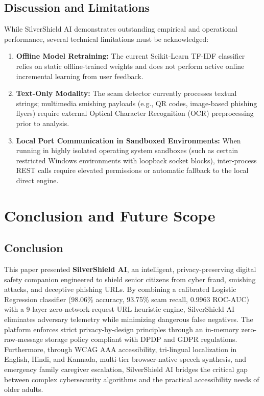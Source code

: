 \documentclass[conference]{IEEEtran}
\begin{document}
\subsection{Discussion and Limitations}
While SilverShield AI demonstrates outstanding empirical and operational performance, several technical limitations must be acknowledged:
\begin{enumerate}
    \item \textbf{Offline Model Retraining:} The current Scikit-Learn TF-IDF classifier relies on static offline-trained weights and does not perform active online incremental learning from user feedback.
    \item \textbf{Text-Only Modality:} The scam detector currently processes textual strings; multimedia smishing payloads (e.g., QR codes, image-based phishing flyers) require external Optical Character Recognition (OCR) preprocessing prior to analysis.
    \item \textbf{Local Port Communication in Sandboxed Environments:} When running in highly isolated operating system sandboxes (such as certain restricted Windows environments with loopback socket blocks), inter-process REST calls require elevated permissions or automatic fallback to the local direct engine.
\end{enumerate}

\section{Conclusion and Future Scope}

\subsection{Conclusion}
This paper presented \textbf{SilverShield AI}, an intelligent, privacy-preserving digital safety companion engineered to shield senior citizens from cyber fraud, smishing attacks, and deceptive phishing URLs. By combining a calibrated Logistic Regression classifier (98.06\% accuracy, 93.75\% scam recall, 0.9963 ROC-AUC) with a 9-layer zero-network-request URL heuristic engine, SilverShield AI eliminates adversary telemetry while minimizing dangerous false negatives. The platform enforces strict privacy-by-design principles through an in-memory zero-raw-message storage policy compliant with DPDP and GDPR regulations. Furthermore, through WCAG AAA accessibility, tri-lingual localization in English, Hindi, and Kannada, multi-tier browser-native speech synthesis, and emergency family caregiver escalation, SilverShield AI bridges the critical gap between complex cybersecurity algorithms and the practical accessibility needs of older adults.
\end{document}
